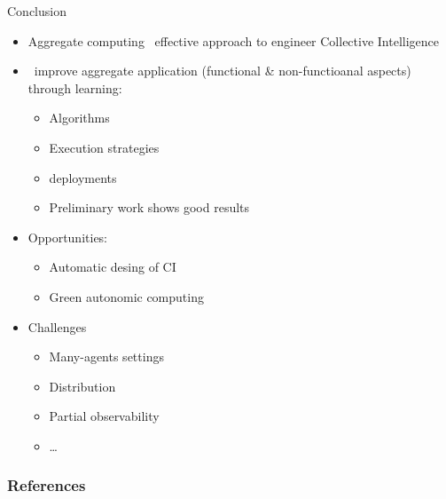\documentclass[8pt, aspectratio=169, handout]{beamer}
\begin{document}
\begin{frame}{Conclusion}
  \begin{card}[Recap]
    \begin{itemize}
      \item Aggregate computing \faArrowRight \, effective approach to engineer Collective Intelligence
      \item {} \faArrowRight \, improve aggregate application (functional \& non-functioanal aspects) through learning:
      \begin{itemize}
        \item Algorithms
        \item Execution strategies
        \item deployments
        \item[\success{\faThumbsUp}] Preliminary work shows good results
      \end{itemize}
      \item Opportunities:
      \begin{itemize}
        \item Automatic desing of CI
        \item Green autonomic computing
      \end{itemize}
      \item Challenges
      \begin{itemize}
        \item Many-agents settings
        \item Distribution
        \item Partial observability
        \item \dots
      \end{itemize}
    \end{itemize}
    
  \end{card}
\end{frame}
\begin{frame}[allowframebreaks]
  \frametitle{References}
  \printbibliography
\end{frame}
\end{document}
